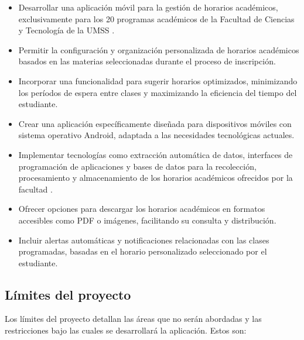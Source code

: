 \begin{itemize}
    \item Desarrollar una aplicación móvil para la gestión de horarios académicos, exclusivamente para los 20 programas académicos de la Facultad de Ciencias y Tecnología de la UMSS \cite{fcyt_umss}.
    \item Permitir la configuración y organización personalizada de horarios académicos basados en las materias seleccionadas durante el proceso de inscripción.
    \item Incorporar una funcionalidad para sugerir horarios optimizados, minimizando los períodos de espera entre clases y maximizando la eficiencia del tiempo del estudiante.
    \item Crear una aplicación específicamente diseñada para dispositivos móviles con sistema operativo Android, adaptada a las necesidades tecnológicas actuales.
    \item Implementar tecnologías como extracción automática de datos, interfaces de programación de aplicaciones y bases de datos para la recolección, procesamiento y almacenamiento de los horarios académicos ofrecidos por la facultad \cite{horarios_fcyt}.
    \item Ofrecer opciones para descargar los horarios académicos en formatos accesibles como PDF o imágenes, facilitando su consulta y distribución.
    \item Incluir alertas automáticas y notificaciones relacionadas con las clases programadas, basadas en el horario personalizado seleccionado por el estudiante.
\end{itemize}

\subsection{Límites del proyecto}

Los límites del proyecto detallan las áreas que no serán abordadas y las restricciones bajo las cuales se desarrollará la aplicación. Estos son:

